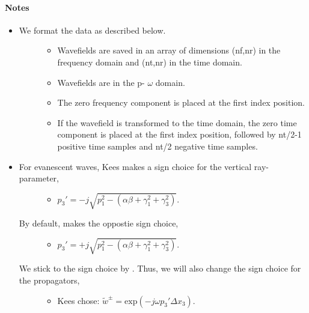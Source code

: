 \documentclass[letterpaper,10pt,english]{sphinxmanual}
\begin{document}
\begin{fulllineitems}
\begin{quote}
\begin{description}
\end{description}\end{quote}
\paragraph{Notes}
\begin{itemize}
\item {} \begin{description}
\item[{We format the data as described below.}] \leavevmode\begin{itemize}
\item {} 
Wavefields are saved in an array of dimensions (nf,nr) in the frequency domain and (nt,nr) in the time domain.

\item {} 
Wavefields are in the p- \(\omega\) domain.

\item {} 
The zero frequency component is placed at the first index position.

\item {} 
If the wavefield is transformed to the time domain, the zero time component is placed at the first index position, followed by nt/2-1 positive time samples and nt/2 negative time samples.

\end{itemize}

\end{description}

\item {} \begin{description}
\item[{For evanescent waves, Kees makes a sign choice for the vertical ray-parameter,}] \leavevmode\begin{itemize}
\item {} 
\(p_3' = -j \sqrt{p_1^2 - (\alpha \beta + \gamma_1^2 + \gamma_3^2)}\).

\end{itemize}

\item[{By default,  makes the oppostie sign choice, }] \leavevmode\begin{itemize}
\item {} 
\(p_3' = +j \sqrt{p_1^2 - (\alpha \beta + \gamma_1^2 + \gamma_3^2)}\).

\end{itemize}

\item[{We stick to the sign choice by . Thus, we will also change the sign choice for the propagators,}] \leavevmode\begin{itemize}
\item {} 
Kees chose: \(\tilde{w}^{\pm} = \mathrm{exp}(-j \omega p_3' \Delta x_3)\).


\end{itemize}
\end{description}
\end{itemize}
\end{fulllineitems}
\end{document}
